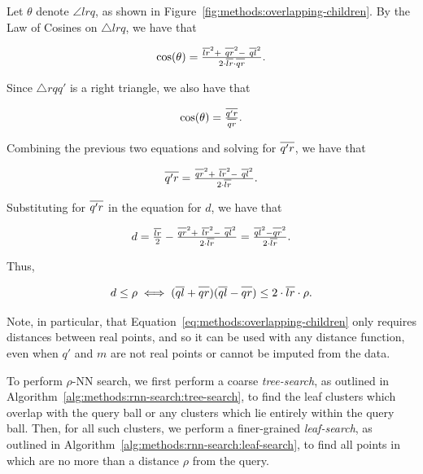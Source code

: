 Let $\theta$ denote $\angle l r q$, as shown in Figure~\ref{fig:methods:overlapping-children}.
By the Law of Cosines on $\triangle l r q$, we have that

\begin{equation*}
    \text{cos}(\theta) = \tfrac{\overline{l r}^2 + \ \overline{q r \vphantom{l}}^2 - \ \overline{q l}^2}{2 \cdot \overline{l r} \cdot \overline{q r \vphantom{l}}}.
\end{equation*}

Since $\triangle r q q'$ is a right triangle, we also have that

\begin{equation*}
    \text{cos}(\theta) = \tfrac{\overline{q' r \vphantom{l}}}{\overline{q r \vphantom{l}}}.
\end{equation*}

Combining the previous two equations and solving for $\overline{q' r \vphantom{l}}$, we have that

\begin{equation*}
    \overline{q' r \vphantom{l}} = \tfrac{\overline{q r \vphantom{l}}^2 + \ \overline{l r}^2 - \ \overline{q l}^2}{2 \cdot \overline{l r}}.
\end{equation*}

Substituting for $\overline{q' r \vphantom{l}}$ in the equation for $d$, we have that

\begin{equation*}
    d = \tfrac{\overline{l r}}{2} - \tfrac{\overline{q r \vphantom{l}}^2 + \ \overline{l r}^2 - \ \overline{q l}^2}{2 \cdot \overline{l r}} = \tfrac{\overline{q l}^2 - \overline{q r \vphantom{l}}^2}{2 \cdot \overline{l r}}.
\end{equation*}

Thus,

\begin{equation}
    d \leq \rho \iff (\overline{q l} + \overline{q r \vphantom{l}})(\overline{q l} - \overline{q r \vphantom{l}}) \leq 2 \cdot \overline{l r} \cdot \rho.
    \label{eq:methods:overlapping-children}
\end{equation}

Note, in particular, that Equation~\ref{eq:methods:overlapping-children} only requires distances between real points, and so it can be used with any distance function, even when $q'$ and $m$ are not real points or cannot be imputed from the data.

To perform $\rho$-NN search, we first perform a coarse \emph{tree-search}, as outlined in Algorithm~\ref{alg:methods:rnn-search:tree-search}, to find the leaf clusters which overlap with the query ball or any clusters which lie entirely within the query ball.
Then, for all such clusters, we perform a finer-grained \emph{leaf-search}, as outlined in Algorithm~\ref{alg:methods:rnn-search:leaf-search}, to find all points in which are no more than a distance $\rho$ from the query.


